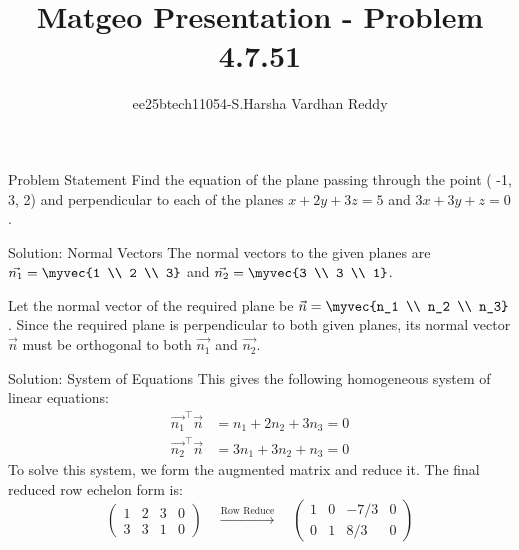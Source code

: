 \documentclass{beamer}
\title{Matgeo Presentation - Problem 4.7.51}
\author{ee25btech11054-S.Harsha Vardhan Reddy}
\numberwithin{equation}{section}
\theoremstyle{remark}
\begin{document}
\begin{frame}
  \titlepage
\end{frame}

\begin{frame}{Problem Statement}
Find the equation of the plane passing through the point ( -1, 3, 2) and perpendicular to each of the planes $x + 2y + 3z = 5$ and $3x + 3y + z = 0$.
\end{frame}

\begin{frame}{Solution: Normal Vectors}
The normal vectors to the given planes are $\vec{n_1} = \myvec{1 \\ 2 \\ 3}$ and $\vec{n_2} = \myvec{3 \\ 3 \\ 1}$.

Let the normal vector of the required plane be $\vec{n} = \myvec{n_1 \\ n_2 \\ n_3}$. Since the required plane is perpendicular to both given planes, its normal vector $\vec{n}$ must be orthogonal to both $\vec{n_1}$ and $\vec{n_2}$.
\end{frame}

\begin{frame}{Solution: System of Equations}
This gives the following homogeneous system of linear equations:
\begin{align}
\vec{n_1}^\top \vec{n} &= n_1 + 2n_2 + 3n_3 = 0 \label{eq:4.7.51.1} \\
\vec{n_2}^\top \vec{n} &= 3n_1 + 3n_2 + n_3 = 0 \label{eq:4.7.51.2}
\end{align}
To solve this system, we form the augmented matrix and reduce it. The final reduced row echelon form is:
\begin{equation}
\left(\begin{array}{ccc|c} 1 & 2 & 3 & 0 \\ 3 & 3 & 1 & 0 \end{array}\right) \quad \xrightarrow{\text{Row Reduce}} \quad \left(\begin{array}{ccc|c} 1 & 0 & -7/3 & 0 \\ 0 & 1 & 8/3 & 0 \end{array}\right)
\end{equation}
\end{frame}
\end{document}
